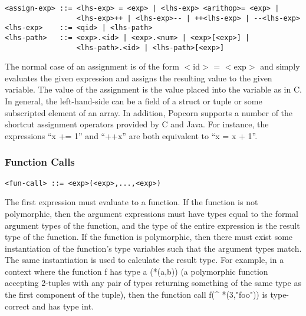 \documentclass[titlepage,10pt]{article}
\begin{document}

\begin{verbatim}
<assign-exp> ::= <lhs-exp> = <exp> | <lhs-exp> <arithop>= <exp> |
                 <lhs-exp>++ | <lhs-exp>-- | ++<lhs-exp> | --<lhs-exp>
<lhs-exp>    ::= <qid> | <lhs-path>
<lhs-path>   ::= <exp>.<id> | <exp>.<num> | <exp>[<exp>] | 
                 <lhs-path>.<id> | <lhs-path>[<exp>]
\end{verbatim}

The normal case of an assignment is of the form $<$id$>$ = $<$exp$>$ and simply
evaluates the given expression and assigns the resulting value to the
given variable.  The value of the assignment is the value placed into
the variable as in C.   In general, the left-hand-side can be a field of
a struct or tuple or some subscripted element of an array.  In addition,
Popcorn supports a number of the shortcut assignment operators provided
by C and Java.  For instance, the expressions ``x += 1'' and ``++x'' are
both equivalent to ``x = x + 1''.

\subsubsection{Function Calls}


\begin{verbatim}
<fun-call> ::= <exp>(<exp>,...,<exp>)
\end{verbatim}

The first expression must evaluate to a function.  If the function is
not polymorphic, then the argument expressions must have types equal to
the formal argument types of the function, and the type of the entire
expression is the result type of the function.  If the function is
polymorphic, then there must exist some instantiation of the function's
type variables such that the argument types match.   The same
instantiation is used to calculate the result type.  For example, in a
context where the function f has type a (*(a,b)) (a polymorphic function
accepting 2-tuples with any pair of types returning something of the
same type as the first component of the tuple), then the function call
f(\^{} *(3,"foo")) is type-correct and has type int.
\end{document}
